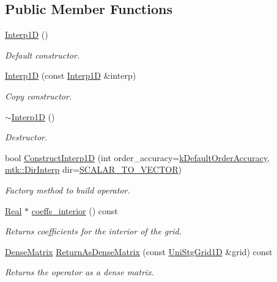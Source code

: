 \subsection*{Public Member Functions}
\begin{DoxyCompactItemize}
\item 
\hyperlink{classmtk_1_1Interp1D_ae56f90c53579c91c1dbe715f7e7361be}{Interp1\+D} ()
\begin{DoxyCompactList}\small\item\em Default constructor. \end{DoxyCompactList}\item 
\hyperlink{classmtk_1_1Interp1D_a92a5ed77144b3824d201a586f4072fd0}{Interp1\+D} (const \hyperlink{classmtk_1_1Interp1D}{Interp1\+D} \&interp)
\begin{DoxyCompactList}\small\item\em Copy constructor. \end{DoxyCompactList}\item 
\hyperlink{classmtk_1_1Interp1D_a52ea06b5e3d7082eb06ade256f4e30fb}{$\sim$\+Interp1\+D} ()
\begin{DoxyCompactList}\small\item\em Destructor. \end{DoxyCompactList}\item 
bool \hyperlink{classmtk_1_1Interp1D_ab1c8e12534886aa185b24be474d1056e}{Construct\+Interp1\+D} (int order\+\_\+accuracy=\hyperlink{group__c01-roots_ga0d95560098eb36420511103637b6952f}{k\+Default\+Order\+Accuracy}, \hyperlink{group__c02-enums_ga674ec67bd1baa04e5dc06c2bcc351972}{mtk\+::\+Dir\+Interp} dir=\hyperlink{namespacemtk_ga674ec67bd1baa04e5dc06c2bcc351972abc9e2b8cd5a497c9f3252a792e356139}{S\+C\+A\+L\+A\+R\+\_\+\+T\+O\+\_\+\+V\+E\+C\+T\+O\+R})
\begin{DoxyCompactList}\small\item\em Factory method to build operator. \end{DoxyCompactList}\item 
\hyperlink{group__c01-roots_gac080bbbf5cbb5502c9f00405f894857d}{Real} $\ast$ \hyperlink{classmtk_1_1Interp1D_a652289cbb0000d3f4e5e8d632aaf4b03}{coeffs\+\_\+interior} () const 
\begin{DoxyCompactList}\small\item\em Returns coefficients for the interior of the grid. \end{DoxyCompactList}\item 
\hyperlink{classmtk_1_1DenseMatrix}{Dense\+Matrix} \hyperlink{classmtk_1_1Interp1D_aee8126b8a4be378a30be4d95b43b384b}{Return\+As\+Dense\+Matrix} (const \hyperlink{classmtk_1_1UniStgGrid1D}{Uni\+Stg\+Grid1\+D} \&grid) const 
\begin{DoxyCompactList}\small\item\em Returns the operator as a dense matrix. \end{DoxyCompactList}\end{DoxyCompactItemize}

